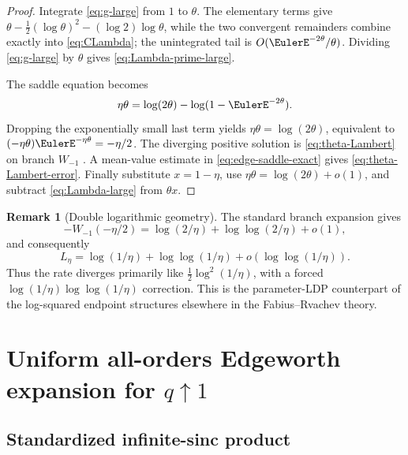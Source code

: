 \documentclass[11pt,a4paper]{article}
\theoremstyle{definition}
\newtheorem{remark}[theorem]{Remark}
\begin{document}
\begin{proof}
Integrate \eqref{eq:g-large} from $1$ to $\theta$.  The elementary terms give
$\theta-\frac12(\log\theta)^2-(\log2)\log\theta$, while the two convergent
remainders combine exactly into \eqref{eq:CLambda}; the unintegrated tail is
$O(\EulerE^{-2\theta}/\theta)$.  Dividing \eqref{eq:g-large} by $\theta$ gives
\eqref{eq:Lambda-prime-large}.

The saddle equation becomes
\begin{equation}
 \eta\theta=\log(2\theta)-\log(1-\EulerE^{-2\theta}).
 \label{eq:edge-saddle-exact}
\end{equation}
Dropping the exponentially small last term yields
$\eta\theta=\log(2\theta)$, equivalent to
$(-\eta\theta)\EulerE^{-\eta\theta}=-\eta/2$.  The diverging positive solution is
\eqref{eq:theta-Lambert} on branch $W_{-1}$ \cite{Corless1996}.  A mean-value estimate in
\eqref{eq:edge-saddle-exact} gives \eqref{eq:theta-Lambert-error}.  Finally
substitute $x=1-\eta$, use
$\eta\theta=\log(2\theta)+o(1)$, and subtract \eqref{eq:Lambda-large} from
$\theta x$.
\end{proof}

\begin{remark}[Double logarithmic geometry]
The standard branch expansion gives
\[
 -W_{-1}(-\eta/2)
 =\log(2/\eta)+\log\log(2/\eta)+o(1),
\]
and consequently
\[
 L_\eta=\log(1/\eta)+\log\log(1/\eta)
 +o(\log\log(1/\eta)).
\]
Thus the rate diverges primarily like $\tfrac12\log^2(1/\eta)$,
with a forced $\log(1/\eta)\log\log(1/\eta)$ correction.  This is the parameter-LDP
counterpart of the log-squared endpoint structures elsewhere in the
Fabius--Rvachev theory.
\end{remark}

\section{Uniform all-orders Edgeworth expansion for \texorpdfstring{$q\uparrow1$}{q tends to 1}}
\label{sec:Edgeworth}

\subsection{Standardized infinite-sinc product}
\end{document}
